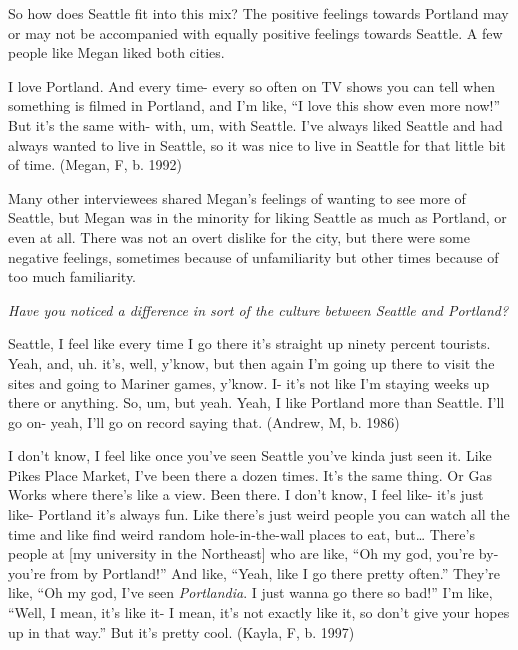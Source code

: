 So how does Seattle fit into this mix? The positive feelings towards Portland may or may not be accompanied with equally positive feelings towards Seattle. A few people like Megan liked both cities.
\begin{num_quote}
    I love Portland. And every time- every so often on TV shows you can tell when something is filmed in Portland, and I'm like, ``I love this show even more now!'' But it's the same with- with, um, with Seattle. I've always liked Seattle and had always wanted to live in Seattle, so it was nice to live in Seattle for that little bit of time. (Megan, F, b. 1992)
    \label{quote:i_like_both}
\end{num_quote}
Many other interviewees shared Megan's feelings of wanting to see more of Seattle, but Megan was in the minority for liking Seattle as much as Portland, or even at all. There was not an overt dislike for the city, but there were some negative feelings, sometimes because of unfamiliarity but other times because of too much familiarity.
\begin{num_quote}
    \textit{Have you noticed a difference in sort of the culture between Seattle and Portland?}

    Seattle, I feel like every time I go there it's straight up ninety percent tourists. Yeah, and, uh. it's, well, y'know, but then again I'm going up there to visit the sites and going to Mariner games, y'know. I- it's not like I'm staying weeks up there or anything. So, um, but yeah. Yeah, I like Portland more than Seattle. I'll go on- yeah, I'll go on record saying that. (Andrew, M, b. 1986)
    \label{quote:seattle_tourists}
\end{num_quote}
\begin{num_quote}
    I don't know, I feel like once you've seen Seattle you've kinda just seen it. Like Pikes Place Market, I've been there a dozen times. It's the same thing. Or Gas Works where there's like a view. Been there. I don't know, I feel like- it's just like- Portland it's always fun. Like there's just weird people you can watch all the time and like find weird random hole-in-the-wall places to eat, but… There's people at [my university in the Northeast] who are like, ``Oh my god, you're by- you're from by Portland!'' And like, ``Yeah, like I go there pretty often.'' They're like, ``Oh my god, I've seen \textit{Portlandia}. I just wanna go there so bad!'' I'm like, ``Well, I mean, it's like it- I mean, it's not exactly like it, so don't give your hopes up in that way.'' But it's pretty cool. (Kayla, F, b. 1997)
    \label{quote:its_the_same_thing}
\end{num_quote}
